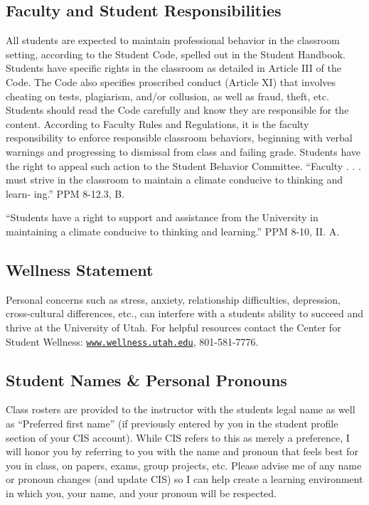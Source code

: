 \documentclass[11pt,]{article}
\begin{document}
\vspace{.2cm}

\hypertarget{faculty-and-student-responsibilities}{%
\subsection{Faculty and Student
Responsibilities}\label{faculty-and-student-responsibilities}}

All students are expected to maintain professional behavior in the
classroom setting, according to the Student Code, spelled out in the
Student Handbook. Students have specific rights in the classroom as
detailed in Article III of the Code. The Code also specifies proscribed
conduct (Article XI) that involves cheating on tests, plagiarism, and/or
collusion, as well as fraud, theft, etc. Students should read the Code
carefully and know they are responsible for the content. According to
Faculty Rules and Regulations, it is the faculty responsibility to
enforce responsible classroom behaviors, beginning with verbal warnings
and progressing to dismissal from class and failing grade. Students have
the right to appeal such action to the Student Behavior Committee.
``Faculty . . . must strive in the classroom to maintain a climate
conducive to thinking and learn- ing.'' PPM 8-12.3, B.

``Students have a right to support and assistance from the University in
maintaining a climate conducive to thinking and learning.'' PPM 8-10,
II. A.

\hypertarget{wellness-statement}{%
\subsection{Wellness Statement}\label{wellness-statement}}

Personal concerns such as stress, anxiety, relationship difficulties,
depression, cross-cultural differences, etc., can interfere with a
students ability to succeed and thrive at the University of Utah. For
helpful resources contact the Center for Student Wellness:
\href{www.wellness.utah.edu}{\texttt{www.wellness.utah.edu}},
801-581-7776.

\hypertarget{student-names-personal-pronouns}{%
\subsection{Student Names \& Personal
Pronouns}\label{student-names-personal-pronouns}}

Class rosters are provided to the instructor with the students legal
name as well as ``Preferred first name'' (if previously entered by you
in the student profile section of your CIS account). While CIS refers to
this as merely a preference, I will honor you by referring to you with
the name and pronoun that feels best for you in class, on papers, exams,
group projects, etc. Please advise me of any name or pronoun changes
(and update CIS) so I can help create a learning environment in which
you, your name, and your pronoun will be respected.
\end{document}
